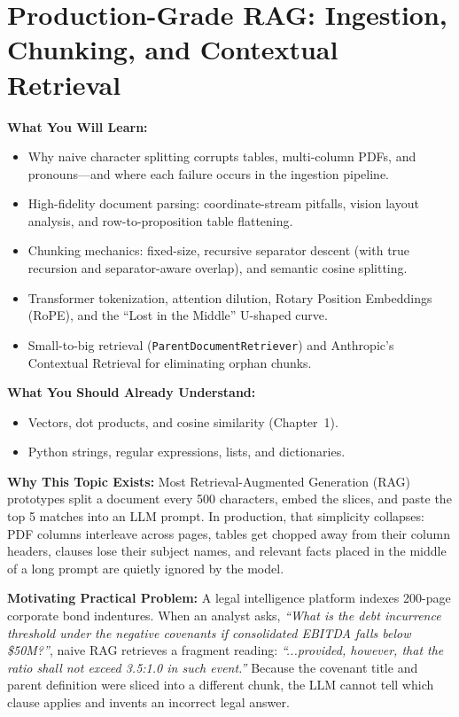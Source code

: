 \chapter{Production-Grade RAG: Ingestion, Chunking, and Contextual Retrieval}
\label{chap:rag}

\begin{chaptergoalsbox}
\textbf{What You Will Learn:}
\begin{itemize}[leftmargin=15pt]
  \item Why naive character splitting corrupts tables, multi-column PDFs, and pronouns---and where each failure occurs in the ingestion pipeline.
  \item High-fidelity document parsing: coordinate-stream pitfalls, vision layout analysis, and row-to-proposition table flattening.
  \item Chunking mechanics: fixed-size, recursive separator descent (with true recursion and separator-aware overlap), and semantic cosine splitting.
  \item Transformer tokenization, attention dilution, Rotary Position Embeddings (RoPE), and the ``Lost in the Middle'' U-shaped curve.
  \item Small-to-big retrieval (\texttt{ParentDocumentRetriever}) and Anthropic's Contextual Retrieval for eliminating orphan chunks.
\end{itemize}

\textbf{What You Should Already Understand:}
\begin{itemize}[leftmargin=15pt]
  \item Vectors, dot products, and cosine similarity (Chapter~1).
  \item Python strings, regular expressions, lists, and dictionaries.
\end{itemize}

\textbf{Why This Topic Exists:}
Most Retrieval-Augmented Generation (RAG) prototypes split a document every 500 characters, embed the slices, and paste the top 5 matches into an LLM prompt. In production, that simplicity collapses: PDF columns interleave across pages, tables get chopped away from their column headers, clauses lose their subject names, and relevant facts placed in the middle of a long prompt are quietly ignored by the model.

\textbf{Motivating Practical Problem:}
A legal intelligence platform indexes 200-page corporate bond indentures. When an analyst asks, \emph{``What is the debt incurrence threshold under the negative covenants if consolidated EBITDA falls below \$50M?''}, naive RAG retrieves a fragment reading: \emph{``...provided, however, that the ratio shall not exceed 3.5:1.0 in such event.''} Because the covenant title and parent definition were sliced into a different chunk, the LLM cannot tell which clause applies and invents an incorrect legal answer.
\end{chaptergoalsbox}

